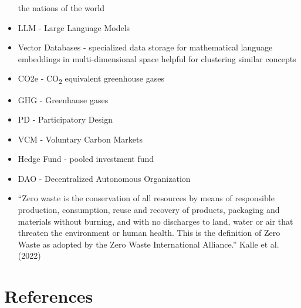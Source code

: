 \documentclass[
  letterpaper,
  DIV=11,
  numbers=noendperiod]{scrartcl}
\begin{document}
\begin{itemize}
  the nations of the world
\item
  LLM - Large Language Models
\item
  Vector Databases - specialized data storage for mathematical language
  embeddings in multi-dimensional space helpful for clustering similar
  concepts
\item
  CO2e - CO\textsubscript{2} equivalent greenhouse gases
\item
  GHG - Greenhause gases
\item
  PD - Participatory Design
\item
  VCM - Voluntary Carbon Markets
\item
  Hedge Fund - pooled investment fund
\item
  DAO - Decentralized Autonomous Organization
\item
  ``Zero waste is the conservation of all resources by means of
  responsible production, consumption, reuse and recovery of products,
  packaging and materials without burning, and with no discharges to
  land, water or air that threaten the environment or human health. This
  is the definition of Zero Waste as adopted by the Zero Waste
  International Alliance.'' Kalle et al. (2022)
\end{itemize}

\newpage

\section{References}\label{references}
\end{document}
